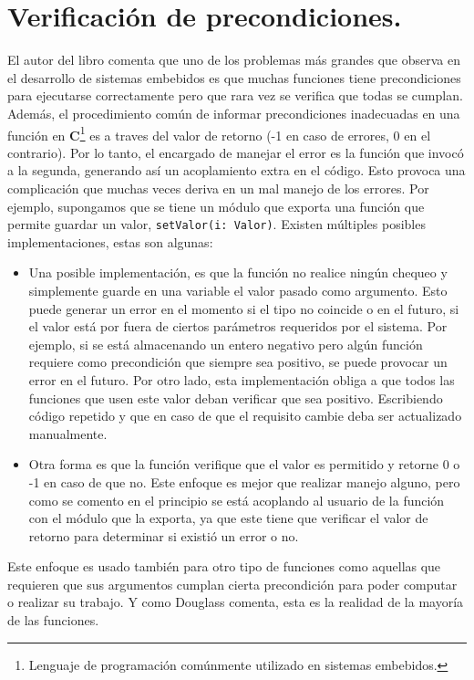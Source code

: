 \section{Verificación de precondiciones.}
El autor del libro \cite{douglass} comenta que uno de los problemas más grandes que observa en el desarrollo de sistemas embebidos es que muchas funciones tiene precondiciones para ejecutarse correctamente pero que rara vez se verifica que todas se cumplan. Además, el procedimiento común de informar precondiciones inadecuadas en una función en \textbf{C}\footnote{Lenguaje de programación comúnmente utilizado en sistemas embebidos.} es a traves del valor de retorno (-1 en caso de errores, 0 en el contrario). Por lo tanto, el encargado de manejar el error es la función que invocó a la segunda, generando así un acoplamiento extra en el código. Esto provoca una complicación que muchas veces deriva en un mal manejo de los errores. Por ejemplo, supongamos que se tiene un módulo que exporta una función que permite guardar un valor, \verb|setValor(i: Valor)|. Existen múltiples posibles implementaciones, estas son algunas:
\begin{itemize}
    \item Una posible implementación, es que la función no realice ningún chequeo y simplemente guarde en una variable el valor pasado como argumento. Esto puede generar un error en el momento si el tipo no coincide o en el futuro, si el valor está por fuera de ciertos parámetros requeridos por el sistema. Por ejemplo, si se está almacenando un entero negativo pero algún función requiere como precondición que siempre sea positivo, se puede provocar un error en el futuro. Por otro lado, esta implementación obliga a que todos las funciones que usen este valor deban verificar que sea positivo. Escribiendo código repetido y que en caso de que el requisito cambie deba ser actualizado manualmente.
    \item Otra forma es que la función verifique que el valor es permitido y retorne 0 o -1 en caso de que no. Este enfoque es mejor que realizar manejo alguno, pero como se comento en el principio se está acoplando al usuario de la función con el módulo que la exporta, ya que este tiene que verificar el valor de retorno para determinar si existió un error o no.
\end{itemize}

Este enfoque es usado también para otro tipo de funciones como aquellas que requieren que sus argumentos cumplan cierta precondición para poder computar o realizar su trabajo. Y como Douglass comenta, esta es la realidad de la mayoría de las funciones.

